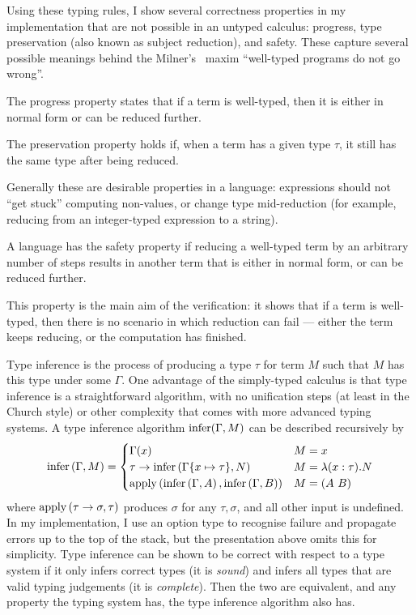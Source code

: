 Using these typing rules, I show several correctness properties in my implementation that are not possible in an untyped calculus: progress, type preservation (also known as subject reduction), and safety.
These capture several possible meanings behind the Milner's~\cite{milner} maxim ``well-typed programs do not go wrong''.

\begin{definition}
The progress property states that if a term is well-typed, then it is either in normal form or can be reduced further.
\end{definition}

\begin{definition}
The preservation property holds if, when a term has a given type \(\tau\), it still has the same type after being reduced.
\end{definition}

Generally these are desirable properties in a language: expressions should not ``get stuck'' computing non-values, or change type mid-reduction (for example, reducing from an integer-typed expression to a string).

\begin{definition}
A language has the safety property if reducing a well-typed term by an arbitrary number of steps results in another term that is either in normal form, or can be reduced further.
\end{definition}

This property is the main aim of the verification: it shows that if a term is well-typed, then there is no scenario in which reduction can fail --- either the term keeps reducing, or the computation has finished.

Type inference is the process of producing a type \(\tau\) for term \(M\) such that \(M\) has this type under some \(\Gamma\).
One advantage of the simply-typed calculus is that type inference is a straightforward algorithm, with no unification steps (at least in the Church style) or other complexity that comes with more advanced typing systems.
A type inference algorithm \(\mathrm{infer}(\Gamma, M)\) can be described recursively by
\[
\mathrm{infer}\left(\Gamma, M\right) =
\begin{cases}
\Gamma(x) & M = x\\
\tau \to \mathrm{infer}\left(\Gamma\{x \mapsto \tau\}, N\right) & M = \lambda (x : \tau). N\\
\mathrm{apply}\left(\mathrm{infer}\left(\Gamma, A\right), \mathrm{infer}\left(\Gamma, B\right)\right) & M = \left(A\ B\right)
\end{cases}
\]
where \(\mathrm{apply}\left(\tau \to \sigma, \tau\right)\) produces \(\sigma\) for any \(\tau, \sigma\), and all other input is undefined.
In my implementation, I use an option type to recognise failure and propagate errors up to the top of the stack, but the presentation above omits this for simplicity.
Type inference can be shown to be correct with respect to a type system if it only infers correct types (it is \emph{sound}) and infers all types that are valid typing judgements (it is \emph{complete}).
Then the two are equivalent, and any property the typing system has, the type inference algorithm also has.

